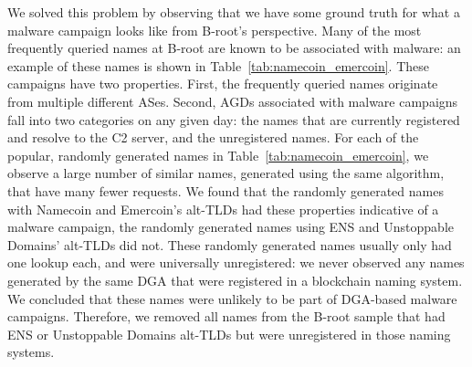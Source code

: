 We solved this problem by observing that we have some ground truth for what a 
malware campaign looks like from B-root's perspective. Many of the most 
frequently queried names at B-root are known to be 
associated with malware: an example of these names is shown in 
Table~\ref{tab:namecoin_emercoin}. These campaigns have two properties. 
First, the frequently queried names originate from multiple different ASes. 
Second, AGDs associated with malware campaigns fall into two categories on any 
given day: the names that are currently registered and resolve to the C2 
server, and the unregistered names. For each of the popular, randomly generated 
names in Table~\ref{tab:namecoin_emercoin}, we observe a large number of 
similar names, generated using the same algorithm, that have many fewer 
requests. We found that the randomly generated names with Namecoin and 
Emercoin's alt-TLDs had these properties indicative of a malware campaign, the 
randomly generated names using ENS and Unstoppable Domains' alt-TLDs did not. 
These randomly generated names usually only had one lookup 
each, and were universally unregistered: we never observed 
any names generated by the same DGA that were registered in a 
blockchain naming system. We concluded that these 
names were unlikely to be part of DGA-based malware 
campaigns. Therefore, we removed all names from the B-root 
sample that had ENS or Unstoppable Domains 
alt-TLDs but were unregistered in those naming systems. 



